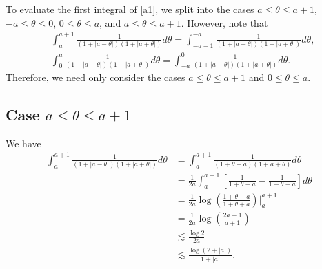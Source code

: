 \documentclass[12pt,reqno]{amsart}
\numberwithin{equation}{section}  %
\numberwithin{figure}{section}
\theoremstyle{plain}
\theoremstyle{definition}
\theoremstyle{remark}
\begin{document}
To evaluate the first integral of \eqref{a1}, we split into the cases $a \le \theta \le
a+1$, $-a \le \theta \le 0$, $0 \le \theta \le a$, and $a \le \theta \le a+1$.
However, note that 
%
%
\begin{equation*}
	\begin{split}
		& \int_{a}^{a+1} \frac{1}{(1 + | a - \theta |)(1 + | a + \theta |)}d \theta =
		\int_{-a-1}^{-a} \frac{1}{(1 + | a - \theta |)(1 + | a + \theta |)}d \theta,
		\\
		& \int_{0}^{a} \frac{1}{(1 + | a - \theta |)(1 + | a + \theta |)}d \theta =
		\int_{-a}^{0} \frac{1}{(1 + | a - \theta |)(1 + | a + \theta |)}d \theta.
	\end{split}
\end{equation*}
%
%
Therefore, we need only consider the cases $a \le \theta \le a+1$ and $0 \le
\theta \le a$.
%
%
\subsection{Case $a \le \theta \le a+1$}
We have
%
%
\begin{equation*}
	\begin{split}
		\int_{a}^{a+1} \frac{1}{(1 + | a-\theta |)(1 + | a + \theta |)}d \theta
		& = \int_{a}^{a+1} \frac{1}{(1 + \theta -a)(1 + a + \theta)}d \theta
		\\
		& = \frac{1}{2a} \int_{a}^{a+1} \left[ \frac{1}{1 + \theta -a} -
		\frac{1}{1 + \theta + a}  \right]d \theta
		\\
		& =\frac{1}{2a} \log\left( \frac{1 + \theta -a}{1 + \theta + a} \right) \Big
		|_a^{a+1}
		\\
		& = \frac{1}{2a} \log\left( \frac{2a+1}{a+1} \right)
		\\
		& \lesssim\frac{\log 2}{2a}
		\\
		& \lesssim \frac{\log(2 + | a |)}{1 + | a |}.
	\end{split}
\end{equation*}
%
%
\end{document}
